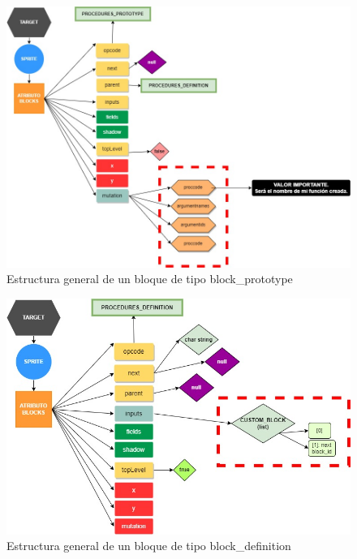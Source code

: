 \documentclass[a4paper, 12pt]{book}
\begin{document}
\begin{figure}[!htb]
  \centering
  \includegraphics[width=13cm, keepaspectratio]{img/block_prototype.jpg}
  \caption{Estructura general de un bloque de tipo block\_prototype}
  \label{fig:controlblock_spe}
\end{figure}

\begin{figure}[!htb]
  \centering
  \includegraphics[width=15cm, keepaspectratio]{img/block_definition.jpg}
  \caption{Estructura general de un bloque de tipo block\_definition}
  \label{fig:controlblock_spe}
\end{figure}
\end{document}
